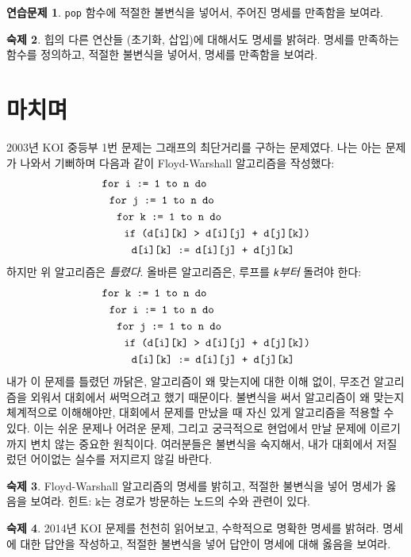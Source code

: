 \documentclass{oblivoir}
\theoremstyle{definition}
\newtheorem{exercise}{연습문제}
\newtheorem{homework}[exercise]{숙제}
\begin{document}
\begin{exercise}
  \texttt{pop} 함수에 적절한 불변식을 넣어서, 주어진 명세를 만족함을
  보여라.
\end{exercise}
\begin{homework}
  힙의 다른 연산들 (초기화, 삽입)에 대해서도 명세를 밝혀라.  명세를
  만족하는 함수를 정의하고, 적절한 불변식을 넣어서, 명세를 만족함을
  보여라.
\end{homework}

\section{마치며}
2003년 KOI 중등부 1번 문제는 그래프의 최단거리를 구하는 문제였다.  나는
아는 문제가 나와서 기뻐하며 다음과 같이 Floyd-Warshall 알고리즘을
작성했다:
\begin{align*}
& \texttt{for \texttt{i} := 1 to n do} \\
& \ \ \texttt{for \texttt{j} := 1 to n do} \\
& \ \ \ \ \texttt{for \texttt{k} := 1 to n do} \\
& \ \ \ \ \ \ \texttt{if (d[i][k] > d[i][j] + d[j][k])} \\
& \ \ \ \ \ \ \ \ \texttt{d[i][k] := d[i][j] + d[j][k]}
\end{align*}
하지만 위 알고리즘은 \emph{틀렸다}.  올바른 알고리즘은, 루프를
\emph{\texttt{k}부터} 돌려야 한다:
\begin{align*}
& \texttt{for \texttt{k} := 1 to n do} \\
& \ \ \texttt{for \texttt{i} := 1 to n do} \\
& \ \ \ \ \texttt{for \texttt{j} := 1 to n do} \\
& \ \ \ \ \ \ \texttt{if (d[i][k] > d[i][j] + d[j][k])} \\
& \ \ \ \ \ \ \ \ \texttt{d[i][k] := d[i][j] + d[j][k]}
\end{align*}
내가 이 문제를 틀렸던 까닭은, 알고리즘이 왜 맞는지에 대한 이해 없이,
무조건 알고리즘을 외워서 대회에서 써먹으려고 했기 때문이다.  불변식을
써서 알고리즘이 왜 맞는지 체계적으로 이해해야만, 대회에서 문제를 만났을
때 자신 있게 알고리즘을 적용할 수 있다.  이는 쉬운 문제나 어려운 문제,
그리고 궁극적으로 현업에서 만날 문제에 이르기까지 변치 않는 중요한
원칙이다.  여러분들은 불변식을 숙지해서, 내가 대회에서 저질렀던
어이없는 실수를 저지르지 않길 바란다.

\begin{homework}
  Floyd-Warshall 알고리즘의 명세를 밝히고, 적절한 불변식을 넣어 명세가
  옳음을 보여라.  힌트: $\texttt{k}$는 경로가 방문하는 노드의 수와
  관련이 있다.
\end{homework}
\begin{homework}
  2014년 KOI 문제를 천천히 읽어보고, 수학적으로 명확한 명세를 밝혀라.
  명세에 대한 답안을 작성하고, 적절한 불변식을 넣어 답안이 명세에 대해
  옳음을 보여라.
\end{homework}
\end{document}
